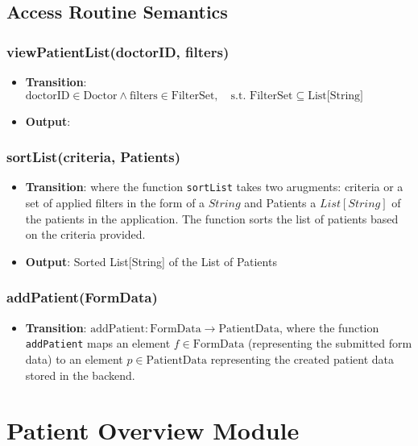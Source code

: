 \documentclass[12pt, titlepage]{article}
\begin{document}
\subsection{Access Routine Semantics}
\subsubsection{viewPatientList(doctorID, filters)}

\begin{itemize}
    \item \textbf{Transition}: $\text{doctorID} \in \text{Doctor} \land \text{filters} \in \text{FilterSet}, \quad \text{s.t. } \text{FilterSet} \subseteq \text{List[String]}$
    \item \textbf{Output}: 
\end{itemize}

\subsubsection{sortList(criteria, Patients)}

\begin{itemize}
    \item \textbf{Transition}: where the function \texttt{sortList} takes two arugments: criteria or a set of applied filters in the form of a $String$  and Patients a $List[String]$ of the patients in the application. The function sorts the list of patients based on the criteria provided.
    \item \textbf{Output}: Sorted List[String] of the List of Patients
\end{itemize}

\subsubsection{addPatient(FormData)}
\begin{itemize}
    \item \textbf{Transition}: $\text{addPatient} : \text{FormData} \to \text{PatientData}$, where the function \texttt{addPatient} maps an element $f \in \text{FormData}$ (representing the submitted form data) to an element $p \in \text{PatientData}$ representing the created patient data stored in the backend.
\end{itemize}


\newpage
\section{Patient Overview Module}
\end{document}
